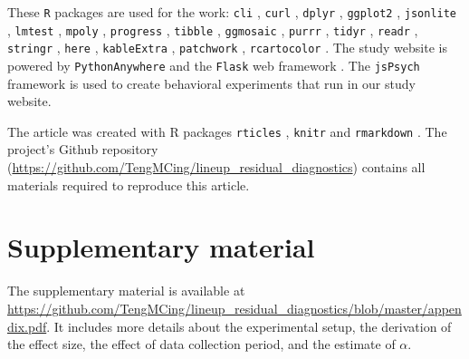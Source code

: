 \documentclass[]{interact}
\theoremstyle{plain}%
\theoremstyle{definition}
\theoremstyle{remark}
\begin{document}
These \texttt{R} packages are used for the work: \texttt{cli}
\citep{cli}, \texttt{curl} \citep{curl}, \texttt{dplyr} \citep{dplyr},
\texttt{ggplot2} \citep{ggplot2}, \texttt{jsonlite} \citep{jsonlite},
\texttt{lmtest} \citep{lmtest}, \texttt{mpoly} \citep{mpoly},
\texttt{progress} \citep{progress}, \texttt{tibble} \citep{tibble},
\texttt{ggmosaic} \citep{ggmosaic}, \texttt{purrr} \citep{purrr},
\texttt{tidyr} \citep{tidyr}, \texttt{readr} \citep{readr},
\texttt{stringr} \citep{stringr}, \texttt{here} \citep{here},
\texttt{kableExtra} \citep{kableextra}, \texttt{patchwork}
\citep{patchwork}, \texttt{rcartocolor} \citep{rcartocolor}. The study
website is powered by \texttt{PythonAnywhere} \citep{pythonanywhere} and
the \texttt{Flask} web framework \citep{flask}. The \texttt{jsPsych}
framework \citep{jspsych} is used to create behavioral experiments that
run in our study website.

The article was created with R packages \texttt{rticles}
\citep{rticles}, \texttt{knitr} \citep{knitr} and \texttt{rmarkdown}
\citep{rmarkdown}. The project's Github repository
(\url{https://github.com/TengMCing/lineup_residual_diagnostics})
contains all materials required to reproduce this article.

\hypertarget{supplementary-material}{%
\section*{Supplementary material}\label{supplementary-material}}

The supplementary material is available at
\url{https://github.com/TengMCing/lineup_residual_diagnostics/blob/master/appendix.pdf}.
It includes more details about the experimental setup, the derivation of
the effect size, the effect of data collection period, and the estimate
of \(\alpha\).



\end{document}
